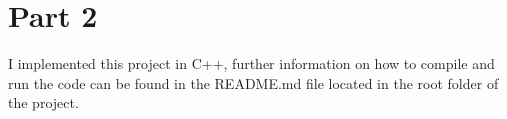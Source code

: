 \section*{Part 2}
I implemented this project in C++, further information on how to compile and run the code can be found in the README.md file located in the root folder of the project.
